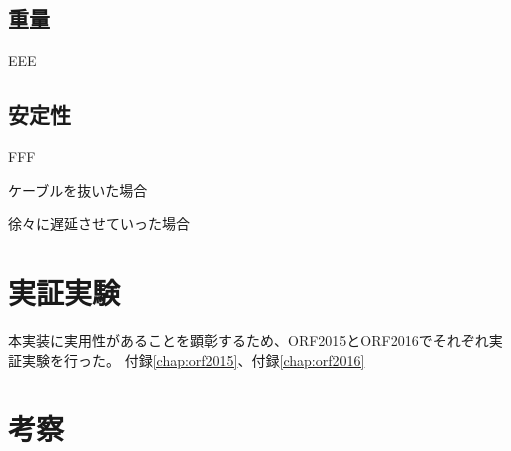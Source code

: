 \subsection{重量}

EEE

\subsection{安定性}

FFF

ケーブルを抜いた場合

徐々に遅延させていった場合

\section{実証実験}
本実装に実用性があることを顕彰するため、ORF2015とORF2016でそれぞれ実証実験を行った。
付録\ref{chap:orf2015}、付録\ref{chap:orf2016}

\section{考察}
